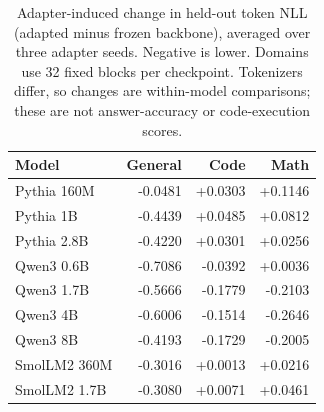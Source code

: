 \begin{table}[t]
\centering\small
\caption{Adapter-induced change in held-out token NLL (adapted minus frozen backbone), averaged over three adapter seeds. Negative is lower. Domains use 32 fixed blocks per checkpoint. Tokenizers differ, so changes are within-model comparisons; these are not answer-accuracy or code-execution scores.}
\label{tab:llm-adaptation}
\begin{tabular}{lrrr}
\toprule
Model & General & Code & Math\\
\midrule
Pythia 160M & -0.0481 & +0.0303 & +0.1146\\
Pythia 1B & -0.4439 & +0.0485 & +0.0812\\
Pythia 2.8B & -0.4220 & +0.0301 & +0.0256\\
Qwen3 0.6B & -0.7086 & -0.0392 & +0.0036\\
Qwen3 1.7B & -0.5666 & -0.1779 & -0.2103\\
Qwen3 4B & -0.6006 & -0.1514 & -0.2646\\
Qwen3 8B & -0.4193 & -0.1729 & -0.2005\\
SmolLM2 360M & -0.3016 & +0.0013 & +0.0216\\
SmolLM2 1.7B & -0.3080 & +0.0071 & +0.0461\\
\bottomrule
\end{tabular}
\end{table}
